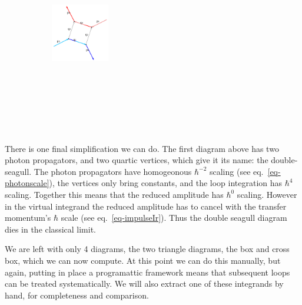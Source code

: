 \documentclass[
  10pt,
  a4paper,
  DIV=11,
  numbers=noendperiod,
  twoside]{scrreprt}
\DeclareRobustCommand{\[}{\begin{equation}}
\DeclareRobustCommand{\]}{\end{equation}}
\begin{document}
\begin{figure}
\begin{minipage}[t]{0.20\linewidth}
{\begin{figure}[H]
{}

\end{figure}

}

\end{minipage}%
%
\begin{minipage}[t]{0.20\linewidth}

{\centering 

\begin{figure}[H]

{\centering \includegraphics[width=1in,height=3.5in]{./scattering_files/figure-latex/dot-figure-2.png}

}

\end{figure}

}

\end{minipage}%

\end{figure}

There is one final simplification we can do. The first diagram above has
two photon propagators, and two quartic vertices, which give it its
name: the double-seagull. The photon propagators have homogeonous
\(\hbar^{-2}\) scaling (see eq.~\ref{eq-photonscale}), the vertices only
bring constants, and the loop integration has \(\hbar^4\) scaling.
Together this means that the reduced amplitude has \(\hbar^0\) scaling.
However in the virtual integrand the reduced amplitude has to cancel
with the transfer momentum's \(\hbar\) scale (see
eq.~\ref{eq-impulseIr}). Thus the double seagull diagram dies in the
classical limit.

We are left with only 4 diagrams, the two triangle diagrams, the box and
cross box, which we can now compute. At this point we can do this
manually, but again, putting in place a programattic framework means
that subsequent loops can be treated systematically. We will also extract one of these integrands
by hand, for completeness and comparison.
\end{document}
